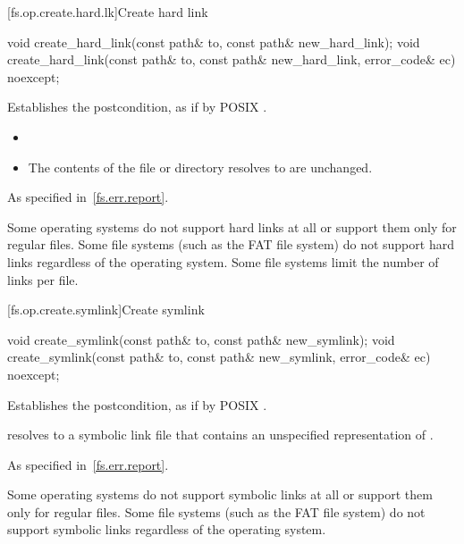 [fs.op.create.hard.lk]{Create hard link}

%
\begin{itemdecl}
void create_hard_link(const path& to, const path& new_hard_link);
void create_hard_link(const path& to, const path& new_hard_link,
                                      error_code& ec) noexcept;
\end{itemdecl}

\begin{itemdescr}
\pnum
\effects
Establishes the postcondition, as if by POSIX .

\pnum
\ensures
\begin{itemize}
\item {}
\item The contents of the file or directory
     resolves to are unchanged.
\end{itemize}

\pnum
\throws
As specified in~\ref{fs.err.report}.

\pnum
\begin{note}
Some operating systems do not support hard links at all or support
  them only for regular files. Some file systems (such as the FAT file system)
  do not support hard links regardless of the operating system.
  Some file systems limit the number of links per file.
\end{note}
\end{itemdescr}

[fs.op.create.symlink]{Create symlink}

%
\begin{itemdecl}
void create_symlink(const path& to, const path& new_symlink);
void create_symlink(const path& to, const path& new_symlink,
                    error_code& ec) noexcept;
\end{itemdecl}

\begin{itemdescr}
\pnum
\effects
Establishes the postcondition, as if by POSIX .

\pnum
\ensures
{} resolves to a symbolic link file that
  contains an unspecified representation of .

\pnum
\throws
As specified in~\ref{fs.err.report}.

\pnum
\begin{note}
Some operating systems do not support symbolic links at all or support
  them only for regular files.
  Some file systems (such as the FAT file system) do not
  support symbolic links regardless of the operating system.
\end{note}
\end{itemdescr}

